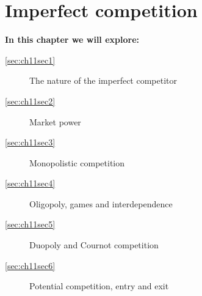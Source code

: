 \chapter{Imperfect competition}\label{chap:imperfectcompetition}

\begin{topics}
	\textbf{In this chapter we will explore:}
	\begin{description}
		\item[\ref{sec:ch11sec1}] The nature of the imperfect competitor
		\item[\ref{sec:ch11sec2}] Market power
		\item[\ref{sec:ch11sec3}] Monopolistic competition
		\item[\ref{sec:ch11sec4}] Oligopoly, games and interdependence
		\item[\ref{sec:ch11sec5}] Duopoly and Cournot competition
		\item[\ref{sec:ch11sec6}] Potential competition, entry and exit
	\end{description}
\end{topics}